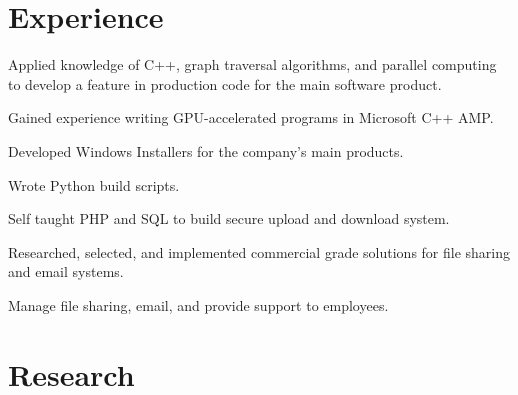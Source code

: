 \documentclass[letterpaper]{deedy-resume} %
\begin{document}
\begin{minipage}[t]{0.66\textwidth} %


\section{Experience}


\vspace{\topsep} %
\begin{tightitemize}
\item Applied knowledge of C++, graph traversal algorithms, and parallel
  computing to develop a feature in production code for the main software
  product.
\item Gained experience writing GPU-accelerated programs in Microsoft C++ AMP.
\item Developed Windows Installers for the company's main products.
\item Wrote Python build scripts.
\end{tightitemize}

\sectionspace %



\begin{tightitemize}
\item Self taught PHP and SQL to build secure upload and download system.
\item Researched, selected, and implemented commercial grade solutions
  for file sharing and email systems.
\item Manage file sharing, email, and provide support to employees.
\end{tightitemize}

\sectionspace %


\section{Research}


\end{minipage}
\end{document}
